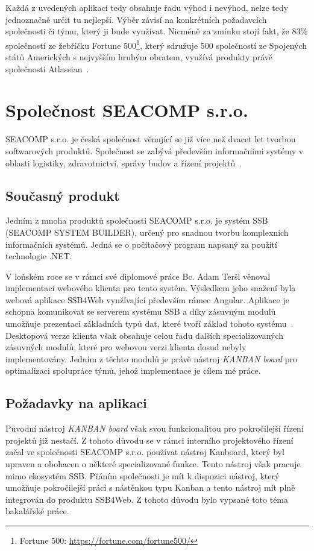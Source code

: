 Každá z uvedených aplikací tedy obsahuje řadu výhod i nevýhod, nelze tedy jednoznačně určit tu nejlepší. Výběr závisí na konkrétních požadavcích společnosti či týmu, který ji bude využívat. Nicméně za zmínku stojí fakt, že 83\% společností ze žebříčku Fortune 500\footnote{Fortune 500: \url{https://fortune.com/fortune500/}}, který sdružuje 500 společností ze Spojených států Amerických s nejvyšším hrubým obratem, využívá produkty právě společnosti Atlassian~\cite{bib:atlassian-customers}.

\section{Společnost SEACOMP s.r.o.}
SEACOMP s.r.o. je česká společnost věnující se již více než dvacet let tvorbou softwarových produktů. Společnost se zabývá především informačními systémy v oblasti logistiky, zdravotnictví, správy budov a řízení projektů~\cite{bib:seacomp-portfolio}.

\subsection{Současný produkt}
Jedním z mnoha produktů společnosti SEACOMP s.r.o. je systém SSB (SEACOMP SYSTEM BUILDER), určený pro snadnou tvorbu komplexních informačních systémů. Jedná se o počítačový program napsaný za použití technologie .NET.

V loňském roce se v rámci své diplomové práce Bc. Adam Teršl věnoval implementaci webového klienta pro tento systém. Výsledkem jeho snažení byla webová aplikace SSB4Web využívající především rámec Angular. Aplikace je schopna komunikovat se serverem systému SSB a díky zásuvným modulů umožňuje prezentaci základních typů dat, které tvoří základ tohoto systému~\cite{bib:tersl}. Desktopová verze klienta však obsahuje celou řadu dalších specializovaných zásuvných modulů, které pro webovou verzi klienta dosud nebyly implementovány. Jedním z těchto modulů je právě nástroj \emph{KANBAN board} pro optimalizaci spolupráce týmů, jehož implementace je cílem mé práce. 

\subsection{Požadavky na aplikaci}
Původní nástroj \emph{KANBAN board} však svou funkcionalitou pro pokročilejší řízení projektů již nestačí. Z tohoto důvodu se v rámci interního projektového řízení začal ve společnosti SEACOMP s.r.o. používat nástroj Kanboard, který byl upraven a obohacen o některé specializované funkce. Tento nástroj však pracuje mimo ekosystém SSB. Přáním společnosti je mít k dispozici nástroj, který umožňuje pokročilejší práci s nástěnkou typu Kanban a tento nástroj mít plně integrován do produktu SSB4Web. Z tohoto důvodu bylo vypsané toto téma bakalářské práce.

